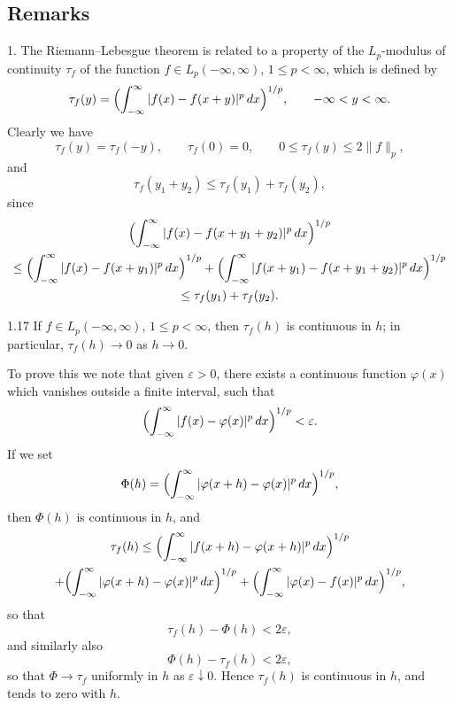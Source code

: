 \subsection*{Remarks}
1. The Riemann--Lebesgue theorem is related to a property of the $L_p$-modulus of continuity $\tau_f$ of the function $f\in L_p(-\infty,\infty)$, $1\le p<\infty$, which is defined by
\begin{equation}\label{eq:I-1.14}
\tau_f(y)=\Bigl(\int_{-\infty}^{\infty}|f(x)-f(x+y)|^p\,dx\Bigr)^{1/p},
\qquad-\infty<y<\infty.
\end{equation}
Clearly we have
\begin{equation}\label{eq:I-1.15}
\tau_f(y)=\tau_f(-y),\qquad\tau_f(0)=0,\qquad
0\le\tau_f(y)\le 2\|f\|_p,
\end{equation}
and
\begin{equation}\label{eq:I-1.16}
\tau_f(y_1+y_2)\le\tau_f(y_1)+\tau_f(y_2),
\end{equation}
since
\begin{multline*}
\Bigl(\int_{-\infty}^{\infty}|f(x)-f(x+y_1+y_2)|^p\,dx\Bigr)^{1/p}\\
\le\Bigl(\int_{-\infty}^{\infty}|f(x)-f(x+y_1)|^p\,dx\Bigr)^{1/p}
+\Bigl(\int_{-\infty}^{\infty}|f(x+y_1)-f(x+y_1+y_2)|^p\,dx\Bigr)^{1/p}\\
\le\tau_f(y_1)+\tau_f(y_2).
\end{multline*}

\begin{nstmt}{1.17}\label{eq:I-1.17}
If $f\in L_p(-\infty,\infty)$, $1\le p<\infty$, then $\tau_f(h)$ is continuous in $h$; in particular, $\tau_f(h)\to 0$ as $h\to 0$.
\end{nstmt}

To prove this we note that given $\varepsilon>0$, there exists a continuous function $\varphi(x)$ which vanishes outside a finite interval, such that
\begin{equation*}
\Bigl(\int_{-\infty}^{\infty}|f(x)-\varphi(x)|^p\,dx\Bigr)^{1/p}<\varepsilon.
\end{equation*}
If we set
\begin{equation*}
\Phi(h)=\Bigl(\int_{-\infty}^{\infty}|\varphi(x+h)-\varphi(x)|^p\,dx\Bigr)^{1/p},
\end{equation*}
then $\Phi(h)$ is continuous in $h$, and
\begin{multline*}
\tau_f(h)\le\Bigl(\int_{-\infty}^{\infty}|f(x+h)-\varphi(x+h)|^p\,dx\Bigr)^{1/p}\\
+\Bigl(\int_{-\infty}^{\infty}|\varphi(x+h)-\varphi(x)|^p\,dx\Bigr)^{1/p}
+\Bigl(\int_{-\infty}^{\infty}|\varphi(x)-f(x)|^p\,dx\Bigr)^{1/p},
\end{multline*}
so that
\begin{equation*}
\tau_f(h)-\Phi(h)<2\varepsilon,
\end{equation*}
and similarly also
\begin{equation*}
\Phi(h)-\tau_f(h)<2\varepsilon,
\end{equation*}
so that $\Phi\to\tau_f$ uniformly in $h$ as $\varepsilon\downarrow 0$. Hence $\tau_f(h)$ is continuous in $h$, and tends to zero with $h$.

